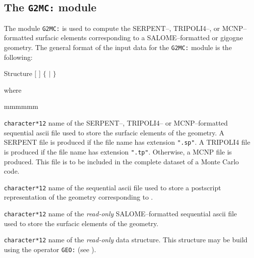 \subsection{The {\tt G2MC:} module}\label{sect:G2MCData}

The module {\tt G2MC:} is used to compute the SERPENT--, TRIPOLI4--, or MCNP--formatted surfacic elements corresponding
to a SALOME--formatted or gigogne geometry. The general format of the input data for the
{\tt G2MC:} module is the following:
\begin{DataStructure}{Structure }
 $[$  $]$ \moc{:=}  $\{$  $|$  $\}$ \moc{;}
\end{DataStructure}

\noindent where
\begin{ListeDeDescription}{mmmmmm}

\item[\dusa{MCFIL}] \texttt{character*12} name of the SERPENT--, TRIPOLI4-- or MCNP--formatted sequential {\sc ascii}
file used to store the surfacic elements of the geometry. A SERPENT file is
produced if the file name has extension {\tt ".sp"}. A TRIPOLI4 file is
produced if the file name has extension {\tt ".tp"}. Otherwise, a MCNP file is
produced. This file is to be included in the complete dataset of a Monte Carlo code.

\item[\dusa{PSFIL}] \texttt{character*12} name of the sequential {\sc ascii}
file used to store a postscript representation of the geometry corresponding to .

\item[\dusa{SURFIL}] \texttt{character*12} name of the {\sl read-only} SALOME--formatted sequential {\sc ascii}
file used to store the surfacic elements of the geometry.

\item[\dusa{GEONAM}] {\tt character*12} name of the {\sl read-only}  data
structure. This structure may be build using the operator {\tt GEO:} (see ).
\end{ListeDeDescription}

\clearpage
